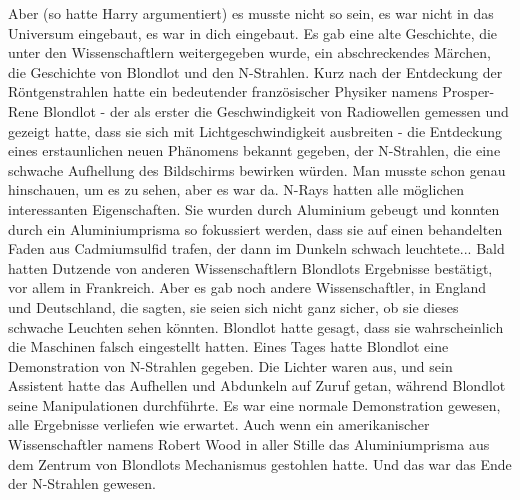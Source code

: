 {Aber (so hatte Harry argumentiert) es musste nicht so sein, es war nicht in das Universum eingebaut, es war in dich eingebaut. Es gab eine alte Geschichte, die unter den Wissenschaftlern weitergegeben wurde, ein abschreckendes Märchen, die Geschichte von Blondlot und den N-Strahlen. Kurz nach der Entdeckung der Röntgenstrahlen hatte ein bedeutender französischer Physiker namens Prosper-Rene Blondlot - der als erster die Geschwindigkeit von Radiowellen gemessen und gezeigt hatte, dass sie sich mit Lichtgeschwindigkeit ausbreiten - die Entdeckung eines erstaunlichen neuen Phänomens bekannt gegeben, der N-Strahlen, die eine schwache Aufhellung des Bildschirms bewirken würden. Man musste schon genau hinschauen, um es zu sehen, aber es war da. N-Rays hatten alle möglichen interessanten Eigenschaften. Sie wurden durch Aluminium gebeugt und konnten durch ein Aluminiumprisma so fokussiert werden, dass sie auf einen behandelten Faden aus Cadmiumsulfid trafen, der dann im Dunkeln schwach leuchtete... Bald hatten Dutzende von anderen Wissenschaftlern Blondlots Ergebnisse bestätigt, vor allem in Frankreich. Aber es gab noch andere Wissenschaftler, in England und Deutschland, die sagten, sie seien sich nicht ganz sicher, ob sie dieses schwache Leuchten sehen könnten. Blondlot hatte gesagt, dass sie wahrscheinlich die Maschinen falsch eingestellt hatten. Eines Tages hatte Blondlot eine Demonstration von N-Strahlen gegeben. Die Lichter waren aus, und sein Assistent hatte das Aufhellen und Abdunkeln auf Zuruf getan, während Blondlot seine Manipulationen durchführte. Es war eine normale Demonstration gewesen, alle Ergebnisse verliefen wie erwartet. Auch wenn ein amerikanischer Wissenschaftler namens Robert Wood in aller Stille das Aluminiumprisma aus dem Zentrum von Blondlots Mechanismus gestohlen hatte. Und das war das Ende der N-Strahlen gewesen.

}
